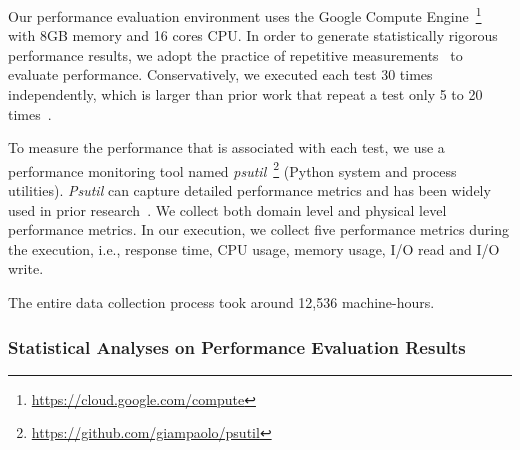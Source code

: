 
Our performance evaluation environment uses the Google Compute Engine~\footnote{\url{https://cloud.google.com/compute}} with 8GB memory and 16 cores CPU. In order to generate statistically rigorous performance results, we adopt the practice of repetitive measurements~\cite{peterfse} to evaluate performance. Conservatively, we executed each test 30 times independently, which is larger than prior work that  %
repeat a test only 5 to 20 times~\cite{Laaber2018MSR, Leitner2016TIT,DBLP:journals/ese/LaaberSL19}. 

To measure the performance that is associated with each test, we %
use a performance monitoring tool named \emph{psutil}~\footnote{\url{https://github.com/giampaolo/psutil}} (Python system and process utilities). %
\emph{Psutil} can capture detailed performance metrics and has been widely used in prior research~\cite{DBLP:conf/icsm/ChenS17,DBLP:conf/wosp/YaoPSSTS18}. We collect both domain level and physical level performance metrics. In our execution, we collect five performance metrics during the execution, i.e., response time, CPU usage, memory usage, I/O read and I/O write.

The entire data collection process took around 12,536 machine-hours.

\subsubsection{Statistical Analyses on Performance Evaluation Results}
\label{sec:statisticalAnalysis}

